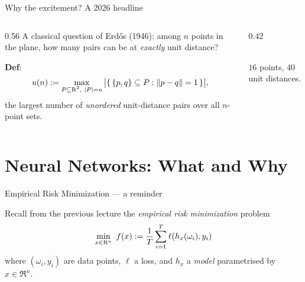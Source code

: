 \documentclass[9pt]{beamer}
\begin{document}
\begin{frame}{Why the excitement? A 2026 headline}

  \begin{columns}[T]
    \begin{column}{0.56\textwidth}
      A classical question of Erd\H{o}s (1946): among $n$ points in the plane,
      how many pairs can be at \emph{exactly} unit distance?

      \medskip

      \textbf{Def}:
        \[
          u(n) := \max_{\substack{P\subseteq\mathrm{R}^2,\ |P|=n}}
          \,\bigl|\{\,\{p,q\}\subseteq P : \left\|p-q\right\|=1\,\}\bigr|,
        \]
        the largest number of \emph{unordered} unit-distance pairs over all
        $n$-point sets.
     
    \end{column}

    \begin{column}{0.42\textwidth}
      \begin{center}
        \\[0.2em]
        {\scriptsize $16$ points, $40$ unit distances.}
      \end{center}
    \end{column}
  \end{columns}

  \medskip
  
  
  \medskip


\end{frame}


\section{Neural Networks: What and Why}


\begin{frame}{Empirical Risk Minimization --- a reminder}

  Recall from the previous lecture the \emph{empirical risk minimization} problem
  \[
    \min_{x\in\mathrm{R}^n} ~f(x) := \frac{1}{T} \sum_{i=1}^T \ell(h_x(\omega_i), y_i)
  \]
  where $(\omega_i, y_i)$ are data points, $\ell$ a loss, and $h_x$ a \emph{model}
  parametrised by $x\in\Re^n$.

  \vfill


\end{frame}
\end{document}
